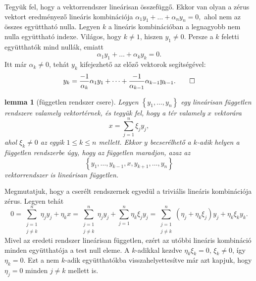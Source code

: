 \documentclass[9pt, a4paper, showtrims]{memoir}
\makeatletter
\renewenvironment{proof}[1][\proofname]
    {\par\pushQED{\qed}%
    \normalfont \topsep6\p@\@plus6\p@\relax
    \trivlist
    \item[\hskip\labelsep
        \itshape
    #1\@addpunct{:}]\ignorespaces}
    {\popQED\endtrivlist\@endpefalse}
\theoremstyle{plain}
\newtheorem{lemma}[proposition]{lemma}
\theoremstyle{remark}
\theoremstyle{definition}
\makeatother
\begin{document}
\begin{proof}
    Tegyük fel, hogy a vektorrendszer lineárisan összefüggő.
    Ekkor van olyan a zérus vektort eredményező lineáris kombinációja
    \(
    \alpha_1y_1+\dots+\alpha_ny_n=0,
    \)
    ahol nem az összes együttható nulla.
    Legyen $k$ a lineáris kombinációban a legnagyobb nem nulla együttható indexe.
    Világos, hogy $k\neq 1$, 
    hiszen $y_1\neq 0$.
    Persze a $k$ feletti együtthatók mind nullák,
    emiatt
    \[
        \alpha_1y_1+\dots+\alpha_ky_k=0.
    \]
    Itt már $\alpha_k\neq 0$, tehát $y_k$ kifejezhető az előző vektorok segítségével:
    \[
        y_k=
        \frac{-1}{\alpha_k}\alpha_1y_1+\dots+\frac{-1}{\alpha_{k-1}}\alpha_{k-1}y_{k-1}.\qedhere
    \]
\end{proof}

\begin{lemma}[független rendszer csere]\label{le:fgtlncsere}
    Legyen $\left\{ y_1,\dots,y_n \right\}$ egy lineárisan független rendszere valamely vektortérnek,
    és tegyük fel, hogy a tér valamely $x$ vektorára
    \[
        x=\sum_{j=1}^n\xi_jy_j,
    \]
    ahol $\xi_k\neq 0$ az egyik $1\leq k\leq n$ mellett. 
    Ekkor $y$ becserélhető a $k$-adik helyen a független rendszerbe 
    úgy, hogy az független maradjon, azaz az
    \[
        \left\{ y_1,\dots,y_{k-1},x,y_{k+1},\dots,y_n \right\}
    \]
    vektorrendszer is lineárisan független.
\end{lemma}
\begin{proof}
    Megmutatjuk, hogy a cserélt rendszernek egyedül a triviális lineáris kombinációja zérus.
    Legyen tehát
    \[
        0
        =\sum_{\substack{j=1\\j\neq k}}^n\eta_jy_j+\eta_kx
        =\sum_{\substack{j=1\\j\neq k}}^n\eta_jy_j+\sum_{j=1}^n\eta_k\xi_jy_j
        =\sum_{\substack{j=1\\j\neq k}}^n\left( \eta_j+\eta_k\xi_j \right)y_j+\eta_k\xi_ky_k.
    \]
    Mivel az eredeti rendszer lineárisan független,
    ezért az utóbbi lineáris kombináció minden együtthatója a test null eleme.
    A $k$-adikkal kezdve $\eta_k\xi_k=0$, $\xi_k\neq 0$, így $\eta_k=0$.
    Ezt a nem $k$-adik együtthatókba visszahelyettesítve
    már azt kapjuk, hogy $\eta_j=0$ minden $j\neq k$ mellett is.
\end{proof}
\end{document}
